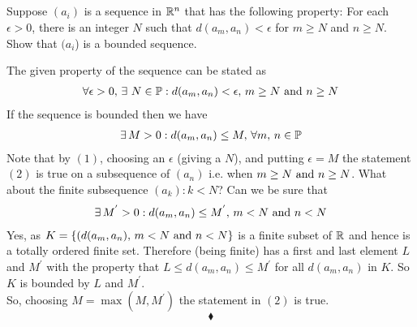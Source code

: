 \subsection{}
\begin{tcolorbox}
 Suppose $(a_i)$ is a sequence in $\mathbb{R}^n$ that has the following property:
For each $\epsilon > 0$, there is an integer $N$ such that $d(a_m, a_n) < \epsilon$
for $m\geq N $ and $n\geq N$. Show that $(a_i$) is a bounded sequence.
\end{tcolorbox}
The given property of the sequence can be stated as
\begin{align}
\forall \epsilon >0, \, \exists\,\, N\in\mathbb{P}: d(a_m,a_n) <\epsilon,\, m\geq N\text{ and } n\geq N
\end{align}
If the sequence is bounded then we have
\begin{align}
\exists\, M>0: d(a_m,a_n) \leq M,\,  \forall m,\, n \in \mathbb{P}
\end{align}
Note that by $(1)$, choosing an $\epsilon$ (giving a $N$), and putting $\epsilon = M$ the statement$(2)$ is true on a subsequence of $(a_n)$ i.e. when $ m\geq N\text{ and } n\geq N$. What about the finite subsequence $(a_k): k< N$? Can we be sure that
\begin{align}
\exists\, M^{'}>0: d(a_m,a_n) \leq M^{'},\,  m< N  \text{ and } n< N
\end{align}
Yes, as $K=\{(d(a_m,a_n) ,\,  m< N  \text{ and } n< N\}$ is a finite subset of $\mathbb{R}$ and hence is a totally ordered finite set. Therefore (being finite) has a first and last element $L$ and $M^{'}$ with the property that $L\leq d(a_m,a_n)\leq M^{'}$
 for all $d(a_m,a_n)$ in $K$. So $K$ is bounded by $L$ and $M^{'}$. \\
 So, choosing $\hat{M}= \max (M,M^{'})$ the statement in $(2)$ is true.
$$\blacklozenge$$\\


